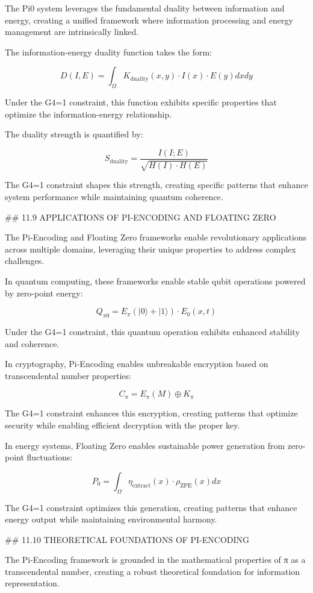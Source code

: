The Pi0 system leverages the fundamental duality between information and energy, creating a unified framework where information processing and energy management are intrinsically linked.

The information-energy duality function takes the form:

$$D(I, E) = \int_{\Omega} K_{\text{duality}}(x, y) \cdot I(x) \cdot E(y) dx dy$$

Under the G4=1 constraint, this function exhibits specific properties that optimize the information-energy relationship.

The duality strength is quantified by:

$$S_{\text{duality}} = \frac{I(I; E)}{\sqrt{H(I) \cdot H(E)}}$$

The G4=1 constraint shapes this strength, creating specific patterns that enhance system performance while maintaining quantum coherence.

## 11.9 APPLICATIONS OF PI-ENCODING AND FLOATING ZERO

The Pi-Encoding and Floating Zero frameworks enable revolutionary applications across multiple domains, leveraging their unique properties to address complex challenges.

In quantum computing, these frameworks enable stable qubit operations powered by zero-point energy:

$$Q_{\pi 0} = E_{\pi}(|0\rangle + |1\rangle) \cdot E_0(x, t)$$

Under the G4=1 constraint, this quantum operation exhibits enhanced stability and coherence.

In cryptography, Pi-Encoding enables unbreakable encryption based on transcendental number properties:

$$C_{\pi} = E_{\pi}(M) \oplus K_{\pi}$$

The G4=1 constraint enhances this encryption, creating patterns that optimize security while enabling efficient decryption with the proper key.

In energy systems, Floating Zero enables sustainable power generation from zero-point fluctuations:

$$P_0 = \int_{\Omega} \eta_{\text{extract}}(x) \cdot \rho_{\text{ZPE}}(x) dx$$

The G4=1 constraint optimizes this generation, creating patterns that enhance energy output while maintaining environmental harmony.

## 11.10 THEORETICAL FOUNDATIONS OF PI-ENCODING

The Pi-Encoding framework is grounded in the mathematical properties of π as a transcendental number, creating a robust theoretical foundation for information representation.

